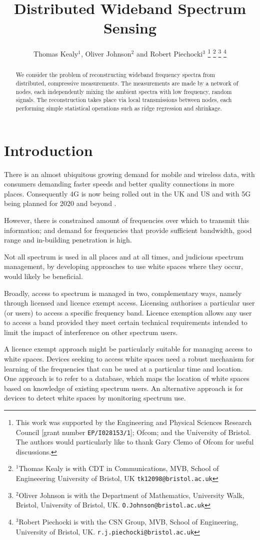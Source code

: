 \documentclass{article}
\title{Distributed Wideband Spectrum Sensing}
\author{Thomas Kealy$^{1}$, Oliver Johnson$^{2}$ and Robert Piechocki$^{3}$%
\thanks{This work was supported by the Engineering and Physical Sciences Research Council [grant number {\tt EP/I028153/1}]; Ofcom; and the University of Bristol. The authors would particularly like to thank Gary Clemo of Ofcom for useful discussions.}%
\thanks{ $^{1}$Thomas Kealy is with CDT in Communications, MVB, School of Engineeering University of Bristol, UK
        {\tt\small tk12098@bristol.ac.uk}}%
\thanks{$^{2}$Oliver Johnson is with the Department of Mathematics, University Walk, Bristol, University of Bristol, UK.
        {\tt\small O.Johnson@bristol.ac.uk}}%
\thanks{$^{3}$Robert Piechocki is with the CSN Group, MVB, School of Engineering, University of Bristol, UK.
        {\tt\small r.j.piechocki@bristol.ac.uk}}%
}
\begin{document}
\maketitle

\begin{abstract}
\noindent We consider the problem of reconstructing wideband frequency spectra from distributed, compressive measurements. The measurements are made by a network of nodes, each independently mixing the ambient spectra with low frequency, random signals. The reconstruction takes place via local transmissions between nodes, each performing simple statistical operations such as ridge regression and shrinkage.
\end{abstract}

\section{Introduction}

There is an almost ubiquitous growing demand for mobile and wireless data, with consumers demanding faster speeds and better quality connections in more places. Consequently 4G is now being rolled out in the UK and US and with 5G being planned for 2020 and beyond \cite{Dahlman2014}.  

However, there is constrained amount of frequencies over which to transmit this information; and demand for frequencies that provide sufficient bandwidth, good range and in-building penetration is high.

Not all spectrum is used in all places and at all times, and judicious spectrum management, by developing approaches to use white spaces where they occur, would likely be beneficial.

Broadly, access to spectrum is managed in two, complementary ways, namely through licensed and licence exempt access. Licensing authorises a particular user (or users) to access a specific frequency band. Licence exemption allows any user to access a band provided they meet certain technical requirements intended to limit the impact of interference on other spectrum users.

A licence exempt approach might be particularly suitable for managing access to white spaces. Devices seeking to access white spaces need a robust mechanism for learning of the frequencies that can be used at a particular time and location. One approach is to refer to a database, which maps the location of white spaces based on knowledge of existing spectrum users. An alternative approach is for devices to detect white spaces by monitoring spectrum use. 
\end{document}
